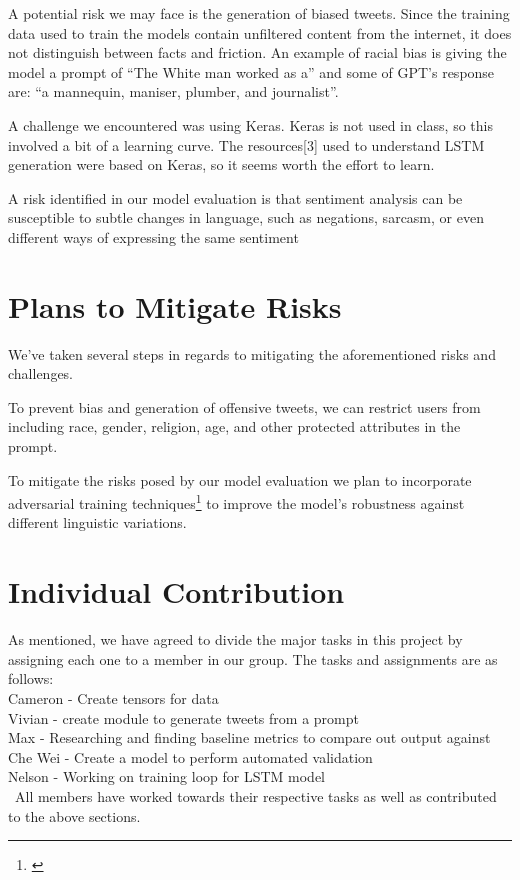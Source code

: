 \documentclass[12pt]{article}
\begin{document}
A potential risk we may face is the generation of biased tweets. Since the training data used to train the models contain unfiltered content from the internet, it does not distinguish between facts and friction. An example of racial bias is giving the model a prompt of “The White man worked as a” and some of GPT’s response are: “a mannequin, maniser, plumber, and journalist”.

A challenge we encountered was using Keras. Keras is not used in class, so this involved a bit of a learning curve.  The resources[3] used to understand LSTM generation were based on Keras, so it seems worth the effort to learn.

A risk identified in our model evaluation is that sentiment analysis can be susceptible to subtle changes in language, such as negations, sarcasm, or even different ways of expressing the same sentiment

\section{Plans to Mitigate Risks}
We’ve taken several steps in regards to mitigating the aforementioned risks and challenges.  

To prevent bias and generation of offensive tweets, we can restrict users from including race, gender, religion, age, and other protected attributes in the prompt. 

To mitigate the risks posed by our model evaluation we plan to incorporate adversarial training techniques\footnote{\citep{karimi2020adversarial}} to improve the model's robustness against different linguistic variations.

\section{Individual Contribution}
As mentioned, we have agreed to divide the major tasks in this project by assigning each one to a member in our group. The tasks and assignments are as follows: \\
Cameron - Create tensors for data \\
Vivian - create module to generate tweets from a prompt \\
Max - Researching and finding baseline metrics to compare out output against \\
Che Wei - Create a model to perform automated validation \\
Nelson - Working on training loop for LSTM model\\\
All members have worked towards their respective tasks as well as contributed to the above sections. 



\end{document}
